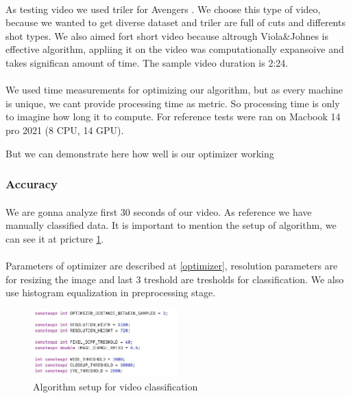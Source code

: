 \documentclass[english]{article}
\begin{document}
		\paragraph{}
			As testing video we used triler for Avengers \cite{marvel}. We choose this type of video, because
			we wanted to get diverse dataset and triler are full of cuts and differents shot types.
			We also aimed fort short video because altrough Viola\&Johnes is effective algorithm, appliing it 
			on the video was computationally expansoive and takes significan amount of time. The sample video duration is 2:24.

		\paragraph{}
			We used time measurements for optimizing our algorithm, but as every machine is unique, we cant provide
			processing time as metric. So processing time is only to imagine how long it to compute.
			For reference tests were ran on Macbook 14 pro 2021 (8 CPU, 14 GPU).

			But we can demonstrate here how well is our optimizer working
		
		\subsubsection{Accuracy}
			\paragraph{}
			We are gonna analyze first 30 seconds of our video. As reference we have manually classified data. It is important to mention
			the setup of algorithm, we can see it at pricture \ref{fig:video_setup}.

			\paragraph{}
			Parameters of optimizer are described at \ref{optimizer}, resolution parameters are for resizing the image and last 3 treshold are tresholds for classification.
			We also use histogram equalization in preprocessing stage.

			\begin{figure}[H]
				\centering
				\includegraphics[width=0.5\textwidth]{figures/video setup.jpg}
				\caption{Algorithm setup for video classification}
				\label{fig:video_setup}
			\end{figure}
\end{document}
